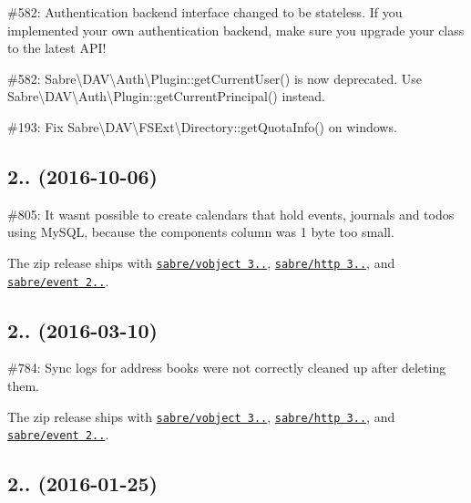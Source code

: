 \begin{DoxyItemize}
\item \#582\+: Authentication backend interface changed to be stateless. If you implemented your own authentication backend, make sure you upgrade your class to the latest A\+P\+I!
\item \#582\+: {\ttfamily Sabre\textbackslash{}D\+AV\textbackslash{}Auth\textbackslash{}Plugin\+::get\+Current\+User()} is now deprecated. Use {\ttfamily Sabre\textbackslash{}D\+AV\textbackslash{}Auth\textbackslash{}Plugin\+::get\+Current\+Principal()} instead.
\item \#193\+: Fix {\ttfamily Sabre\textbackslash{}D\+AV\textbackslash{}F\+S\+Ext\textbackslash{}Directory\+::get\+Quota\+Info()} on windows.
\end{DoxyItemize}

\subsection*{2.. (2016-\/10-\/06) }


\begin{DoxyItemize}
\item \#805\+: It wasn\textquotesingle{}t possible to create calendars that hold events, journals and todos using My\+S\+QL, because the {\ttfamily components} column was 1 byte too small.
\item The zip release ships with \href{http://sabre.io/vobject/}{\tt sabre/vobject 3..}, \href{http://sabre.io/http/}{\tt sabre/http 3..}, and \href{http://sabre.io/event/}{\tt sabre/event 2..}.
\end{DoxyItemize}

\subsection*{2.. (2016-\/03-\/10) }


\begin{DoxyItemize}
\item \#784\+: Sync logs for address books were not correctly cleaned up after deleting them.
\item The zip release ships with \href{http://sabre.io/vobject/}{\tt sabre/vobject 3..}, \href{http://sabre.io/http/}{\tt sabre/http 3..}, and \href{http://sabre.io/event/}{\tt sabre/event 2..}.
\end{DoxyItemize}

\subsection*{2.. (2016-\/01-\/25) }


